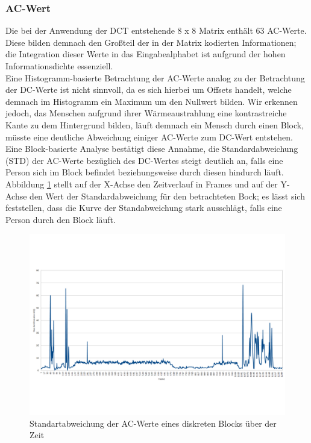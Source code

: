 \subsubsection{AC-Wert}
\label{sec:ac-wert}

Die bei der Anwendung der DCT entstehende 8 x 8 Matrix enthält 63 AC-Werte. Diese bilden demnach den Großteil der in der Matrix kodierten Informationen; die Integration dieser Werte in das Eingabealphabet ist aufgrund der hohen Informationsdichte essenziell.\\
Eine Histogramm-basierte Betrachtung der AC-Werte analog zu der Betrachtung der DC-Werte ist nicht sinnvoll, da es sich hierbei um Offsets handelt, welche demnach im Histogramm ein Maximum um den Nullwert bilden.
Wir erkennen jedoch, das Menschen aufgrund ihrer Wärmeaustrahlung eine kontrastreiche Kante zu dem Hintergrund bilden, läuft demnach ein Mensch durch einen Block, müsste eine deutliche Abweichung einiger AC-Werte zum DC-Wert entstehen.
Eine Block-basierte Analyse bestätigt diese Annahme, die Standardabweichung (STD) der AC-Werte bezüglich des DC-Wertes steigt deutlich an, falls eine Person sich im Block befindet beziehungsweise durch diesen hindurch läuft.\\
Abbildung \ref{fig:ac_over_time} stellt auf der X-Achse den Zeitverlauf in Frames und auf der Y-Achse den Wert der Standardabweichung für den betrachteten Bock; es lässt sich feststellen, dass die Kurve der Standabweichung stark ausschlägt, falls eine Person durch den Block läuft.\\
\begin{figure}[H]
	\centering
	\includegraphics[trim=0cm 4.5cm 0cm 4cm, clip=true,width=1\textwidth]{bilder/05_AC_over_time.pdf}
	\caption{Standartabweichung der AC-Werte eines diskreten Blocks über der Zeit}
	\label{fig:ac_over_time}
\end{figure}
